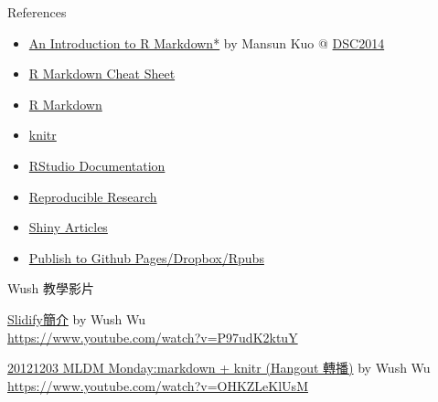 \documentclass[ignorenonframetext,]{beamer}
\providecommand{\tightlist}{%
  \setlength{\itemsep}{0pt}\setlength{\parskip}{0pt}}
\begin{document}
\begin{frame}{References}

\begin{itemize}
\tightlist
\item
  \href{http://mansunkuo.github.io/rmd_tutorial/}{An Introduction to R
  Markdown*} by Mansun Kuo @
  \href{http://taiwanrusergroup.github.io/DSC2014Tutorial/}{DSC2014}
\item
  \href{http://shiny.rstudio.com/articles/rm-cheatsheet.html}{R Markdown
  Cheat Sheet}
\item
  \href{http://rmarkdown.rstudio.com/}{R Markdown}
\item
  \href{http://yihui.name/knitr/}{knitr}
\item
  \href{https://support.rstudio.com/hc/en-us/categories/200035113-Documentation}{RStudio
  Documentation}
\item
  \href{https://www.coursera.org/course/repdata}{Reproducible Research}
\item
  \href{http://shiny.rstudio.com/articles/}{Shiny Articles}
\item
  \href{http://slidify.org/publish.html}{Publish to Github
  Pages/Dropbox/Rpubs}
\end{itemize}

\end{frame}

\begin{frame}{Wush 教學影片}

\href{https://www.youtube.com/watch?v=P97udK2ktuY}{Slidify簡介} by Wush
Wu\\
\url{https://www.youtube.com/watch?v=P97udK2ktuY}

\href{https://www.youtube.com/watch?v=OHKZLeKlUsM}{20121203 MLDM
Monday:markdown + knitr (Hangout 轉播)} by Wush Wu\\
\url{https://www.youtube.com/watch?v=OHKZLeKlUsM}

\end{frame}
\end{document}
